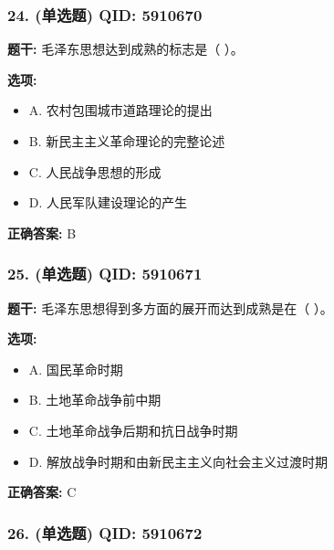 \documentclass[12pt,UTF8]{ctexart}
\begin{document}
\subsubsection*{24. (单选题) \small QID: 5910670}

\textbf{题干:}
毛泽东思想达到成熟的标志是（ ）。

\textbf{选项:}
\begin{itemize}[leftmargin=*]

  \item A. 农村包围城市道路理论的提出

  \item B. 新民主主义革命理论的完整论述

  \item C. 人民战争思想的形成

  \item D. 人民军队建设理论的产生

\end{itemize}

\textbf{正确答案:}
B

\vspace{0.3em}\hrulefill\vspace{0.7em}

\subsubsection*{25. (单选题) \small QID: 5910671}

\textbf{题干:}
毛泽东思想得到多方面的展开而达到成熟是在（ ）。

\textbf{选项:}
\begin{itemize}[leftmargin=*]

  \item A. 国民革命时期

  \item B. 土地革命战争前中期

  \item C. 土地革命战争后期和抗日战争时期

  \item D. 解放战争时期和由新民主主义向社会主义过渡时期

\end{itemize}

\textbf{正确答案:}
C

\vspace{0.3em}\hrulefill\vspace{0.7em}

\subsubsection*{26. (单选题) \small QID: 5910672}
\end{document}
